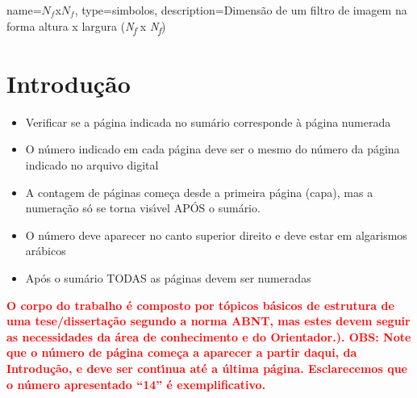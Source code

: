 {%
	name=$N_{f}$x$N_{f}$,
	type=simbolos,
	description={Dimensão de um filtro de imagem na forma altura x largura (\textit{N\textsubscript{f}} x \textit{N\textsubscript{f}})}
}

\printglossary[type=simbolos,title={Lista de símbolos}]
\cleardoublepage

\tableofcontents*
\cleardoublepage



\textual

\linenumbers
\chapter{Introdu\c{c}\~{a}o}
\label{cap:intro}

\begin{itemize}
    \item Verificar se a p\'{a}gina indicada no sum\'{a}rio corresponde \`{a} p\'{a}gina numerada
    \item O n\'{u}mero indicado em cada p\'{a}gina deve ser o mesmo do n\'{u}mero da p\'{a}gina indicado no arquivo digital
    \item A contagem de p\'{a}ginas come\c{c}a desde a primeira p\'{a}gina (capa), mas a numera\c{c}\~{a}o s\'{o} se torna vis\'{\i}vel AP\'{O}S o sum\'{a}rio.
    \item O n\'{u}mero deve aparecer no canto superior direito e deve estar em algarismos ar\'{a}bicos
    \item Ap\'{o}s o sum\'{a}rio TODAS as p\'{a}ginas devem ser numeradas
\end{itemize}


\textbf{\textcolor{red}{O corpo do trabalho \'{e} composto por t\'{o}picos b\'{a}sicos de estrutura de uma tese/disserta\c{c}\~{a}o segundo a norma ABNT, mas estes devem seguir as necessidades da \'{a}rea de conhecimento e do Orientador.).  OBS: Note que o n\'{u}mero de p\'{a}gina come\c{c}a a aparecer a partir daqui, da Introdu\c{c}\~{a}o, e deve ser cont\'{\i}nua at\'{e} a \'{u}ltima p\'{a}gina. Esclarecemos que o n\'{u}mero apresentado “14” \'{e} exemplificativo.   }}

